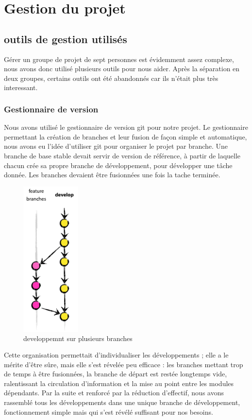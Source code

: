 \chapter{Gestion du projet}

\section{outils de gestion utilisés}

Gérer un groupe de projet de sept personnes est évidemment assez complexe, nous avons donc utilisé plusieurs outils pour nous aider. Après la séparation en deux groupes, certains outils ont été abandonnés car ils n'était plus très interessant.

\subsection{Gestionnaire de version}

Nous avons utilisé le gestionnaire de version git pour notre projet. Le gestionnaire permettant la création de branches et leur fusion de façon simple et automatique, nous avons eu l'idée d'utiliser git pour organiser le projet par branche. Une branche de base stable devait servir de version de référence, à partir de laquelle chacun crée sa propre branche de développement, pour développer une tâche donnée. Les branches devaient être fusionnées une fois la tache terminée. 

\begin{figure}[h!]
\center
\includegraphics[width=30mm]{Images/feature_branches.png}
\caption{developpemnt sur plusieurs branches}
\end{figure}

Cette organisation permettait d'individualiser les développements ; elle a le mérite d'être sûre, mais elle s'est révelée peu efficace : les branches mettant trop de temps à être fusionnées, la branche de départ est restée longtemps vide, ralentissant la circulation d'information et la mise au point entre les modules dépendants. Par la suite et renforcé par la réduction d'effectif, nous avons rassemblé tous les développements dans une unique branche de développement, fonctionnement simple mais qui s'est révélé suffisant pour nos besoins. 

